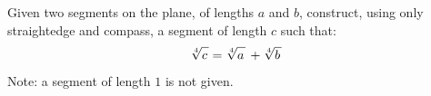 Given two segments on the plane, of lengths $a$ and $b$,
construct, using only straightedge and compass,
a segment of length $c$ such that:
\begin{equation*}
 \sqrt[4]{c \vphantom{ab} \mspace{2mu}} = \sqrt[4]{a \vphantom{bc} \mspace{2mu}} \, + \sqrt[4]{b \vphantom{ac} \mspace{2mu}}
\end{equation*}
Note: a segment of length $1$ is not given.
